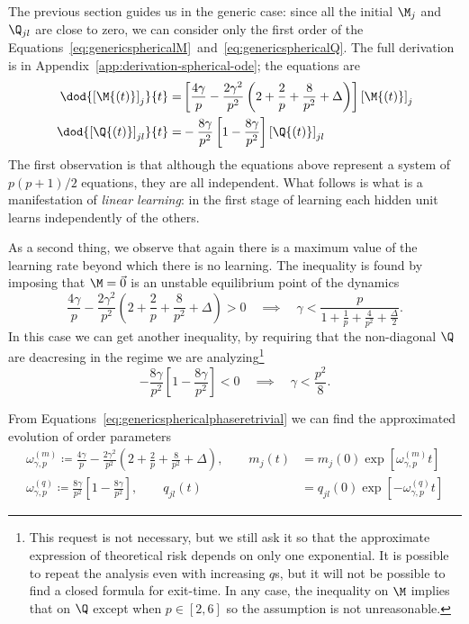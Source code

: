 The previous section guides us in the generic case: since all the initial \(\M_j\) and \(\Q_{jl}\) are close to zero,
we can consider only the first order of the Equations~\eqref{eq:genericsphericalM}~and~\eqref{eq:genericsphericalQ}.
The full derivation is in Appendix~\ref{app:derivation-spherical-ode}; the equations are
\begin{subequations}\label{eq:genericsphericalphaseretrivial}\begin{align}
  \dod{\left[\M{\left(t\right)}\right]_{j}}{t} =&
    \left[
      \frac{4 \gamma}{p} -\frac{2 \gamma^2}{p^2} \left(2 +\frac{2}{p} + \frac{8}{p^2} + \Delta \right)
    \right] \left[\M{\left(t\right)}\right]_{j} \\
  \dod{\left[\Q{\left(t\right)}\right]_{jl}}{t} =&
   -\frac{8 \gamma}{p^2} \left[1-\frac{8\gamma}{p^2}\right] \left[\Q{\left(t\right)}\right]_{jl}
\end{align}\end{subequations}
The first observation is that although the equations above represent a system of \(p(p+1)/2\) equations,
they are all independent. What follows is what is a manifestation of \emph{linear learning}: 
in the first stage of learning each hidden unit learns independently of the others.

As a second thing, we observe that again there is a maximum value of the learning rate beyond which there is no learning.
The inequality is found by imposing that \(\M=\vec{0}\) is an unstable equilibrium point of the dynamics
\[
  \frac{4 \gamma}{p} -\frac{2 \gamma^2}{p^2} \left(2 +\frac{2}{p} + \frac{8}{p^2} + \Delta \right) > 0 \quad \implies\quad
  \gamma < \frac{p}{1 +\frac{1}{p} + \frac{4}{p^2} + \frac\Delta2}.
\]
In this case we can get another inequality, by requiring that the non-diagonal \(\Q\) are deacresing in the regime we are analyzing\footnote{
  This request is not necessary, but we still ask it so that the approximate expression of theoretical risk depends on only one exponential.
  It is possible to repeat the analysis even with increasing \(q\)s, but it will not be possible to find a closed formula for exit-time.
  In any case, the inequality on \(\M\) implies that on \(\Q\) except when \(p\in[2,6]\) so the assumption is not unreasonable.
}
\[
  -\frac{8 \gamma}{p^2} \left[1-\frac{8\gamma}{p^2}\right] < 0 \quad \implies\quad
  \gamma < \frac{p^2}{8}.
\]

From Equations~\eqref{eq:genericsphericalphaseretrivial} we can find the approximated evolution of order parameters
\[\begin{split}
  \omega^{(m)}_{\gamma,p} \coloneqq \frac{4 \gamma}{p} -\frac{2 \gamma^2}{p^2} \left(2 +\frac{2}{p} + \frac{8}{p^2} + \Delta \right), \qquad
  m_j{(t)} &= m_j{(0)} \exp\left[\omega^{(m)}_{\gamma,p}t\right] \\
  \omega^{(q)}_{\gamma,p} \coloneqq \frac{8 \gamma}{p^2} \left[1-\frac{8\gamma}{p^2}\right], \qquad
  q_{jl}{(t)} &= q_{jl}{(0)} \exp\left[-\omega^{(q)}_{\gamma,p}t\right]
\end{split}\]

